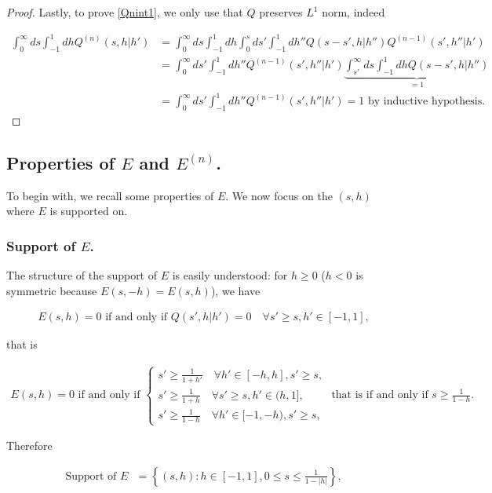 \documentclass[a4paper,10pt,reqno]{amsart}
\numberwithin{equation}{subsection}
\numberwithin{figure}{subsection}
\begin{document}
\begin{proof}
Lastly, to prove \eqref{Qnint1}, we only use that $Q$ preserves $L^1$ norm, indeed

{\footnotesize\begin{align*}
\int_0^{\infty}ds\int_{-1}^1dhQ^{(n)}(s,h|h')&=\int_0^{\infty}ds\int_{-1}^1dh\int_0^sds'\int_{-1}^1dh''Q(s-s',h|h'')Q^{(n-1)}(s',h''|h')
\\
&=\int_0^{\infty}ds'\int_{-1}^1dh''Q^{(n-1)}(s',h''|h')\underbrace{\int_{s'}^{\infty}ds\int_{-1}^1dhQ(s-s',h|h'')}_{=1}
\\
&=\int_0^{\infty}ds'\int_{-1}^1dh''Q^{(n-1)}(s',h''|h')=1\textrm{ by inductive hypothesis}.
\end{align*}}

\end{proof}
\subsection{Properties of $E$ and $E^{(n)}$.}
To begin with, we recall some properties of $E$. We now focus on the $(s,h)$ where $E$ is supported on.
\newline
\subsubsection{Support of $E$.}
The structure of the support of $E$ is easily understood: for $h\geq0$ ($h<0$ is symmetric because $E(s,-h)=E(s,h)$), we have

\begin{align*}
E(s,h)=0\textrm{ if and only if } Q(s',h|h')=0\quad\forall s'\geq s,h'\in[-1,1],
\end{align*}

that is

{\scriptsize\begin{align*}
E(s,h)=0\textrm{ if and only if }\left\{\begin{array}{lcr}s'\geq\frac{1}{1+h'}\quad\forall h'\in[-h,h],s'\geq s,\\ s'\geq\frac{1}{1+h}\quad\forall s'\geq s,h'\in(h,1],\\s'\geq\frac{1}{1-h}\quad\forall h'\in[-1,-h),s'\geq s,\end{array}\right.\textrm{ that is if and only if }s\geq\frac{1}{1-h}.
\end{align*}}

Therefore 

\begin{align}\label{sptE}
\textrm{Support of $E$ }=\left\{(s,h):h\in[-1,1],0\leq s\leq\frac{1}{1-|h|}\right\},
\end{align}
\end{document}
